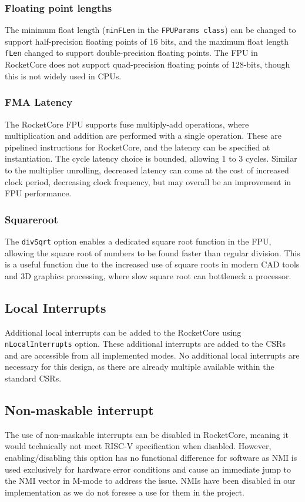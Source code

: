 \subsubsection{Floating point lengths}
The minimum float length (\texttt{minFLen} in the \texttt{FPUParams class}) can be changed to support half-precision floating points of 16 bits, and the maximum float length \texttt{fLen} changed to support double-precision floating points. The FPU in RocketCore does not support quad-precision floating points of 128-bits, though this is not widely used in CPUs.

\subsubsection{FMA Latency}
The RocketCore FPU supports fuse multiply-add operations, where multiplication and addition are performed with a single operation. These are pipelined instructions for RocketCore, and the latency can be specified at instantiation. The cycle latency choice is bounded, allowing 1 to 3 cycles. Similar to the multiplier unrolling, decreased latency can come at the cost of increased clock period, decreasing clock frequency, but may overall be an improvement in FPU performance.

\subsubsection{Squareroot}
The \texttt{divSqrt} option enables a dedicated square root function in the FPU, allowing the square root of numbers to be found faster than regular division. This is a useful function due to the increased use of square roots in modern CAD tools and 3D graphics processing, where slow square root can bottleneck a processor\cite{squareroot-fpu}.

\subsection{Local Interrupts}
Additional local interrupts can be added to the RocketCore using \texttt{nLocalInterrupts} option. These additional interrupts are added to the CSRs and are accessible from all implemented modes. No additional local interrupts are necessary for this design, as there are already multiple available within the standard CSRs.

\subsection{Non-maskable interrupt}
The use of non-maskable interrupts can be disabled in RocketCore, meaning it would technically not meet RISC-V specification when disabled. However, enabling/disabling this option has no functional difference for software as NMI is used exclusively for hardware error conditions and cause an immediate jump to the NMI vector in M-mode to address the issue. NMIs have been disabled in our implementation as we do not foresee a use for them in the project.

